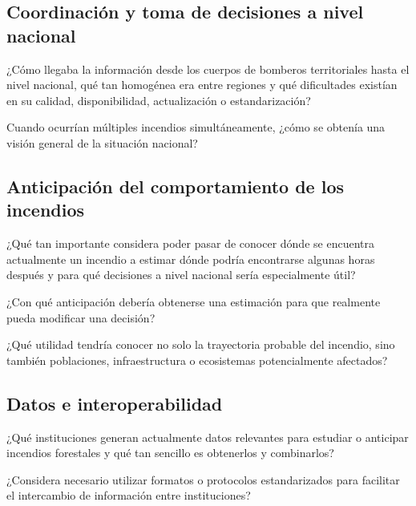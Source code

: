 
\subsection{Coordinación y toma de decisiones a nivel nacional}

\begin{enumerate}

  \pregunta ¿Cómo llegaba la información desde los cuerpos de bomberos territoriales hasta el nivel nacional, qué tan homogénea era entre regiones y qué dificultades existían en su calidad, disponibilidad, actualización o estandarización?



  \pregunta Cuando ocurrían múltiples incendios simultáneamente, ¿cómo se obtenía una visión general de la situación nacional?


\end{enumerate}


\subsection{Anticipación del comportamiento de los incendios}

\begin{enumerate}
  \pregunta ¿Qué tan importante considera poder pasar de conocer dónde se encuentra actualmente un incendio a estimar dónde podría encontrarse algunas horas después y para qué decisiones a nivel nacional sería especialmente útil?


  \pregunta ¿Con qué anticipación debería obtenerse una estimación para que realmente pueda modificar una decisión?



  \pregunta ¿Qué utilidad tendría conocer no solo la trayectoria probable del incendio, sino también poblaciones, infraestructura o ecosistemas potencialmente afectados?

\end{enumerate}


\subsection{Datos e interoperabilidad}

\begin{enumerate}
  \pregunta ¿Qué instituciones generan actualmente datos relevantes para estudiar o anticipar incendios forestales y qué tan sencillo es obtenerlos y combinarlos?




  \pregunta ¿Considera necesario utilizar formatos o protocolos estandarizados para facilitar el intercambio de información entre instituciones?

\end{enumerate}


